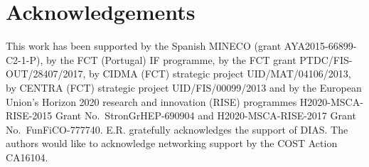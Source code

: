 \documentclass[twocolumn,aps,showpacs,showkeys,prd,superscriptaddress,byrevtex, amsmath]{revtex4-1}
\begin{document}
\section*{Acknowledgements}

This work has been supported by the Spanish MINECO (grant AYA2015-66899-C2-1-P), by the FCT (Portugal) IF programme, by the FCT grant PTDC/FIS-OUT/28407/2017, by  CIDMA (FCT) strategic project UID/MAT/04106/2013, by CENTRA (FCT) strategic project UID/FIS/00099/2013 and by  the  European  Union's  Horizon  2020  research  and  innovation  (RISE) programmes H2020-MSCA-RISE-2015 Grant No.~StronGrHEP-690904 and H2020-MSCA-RISE-2017 Grant No.~FunFiCO-777740. E.R. gratefully acknowledges the support of DIAS. The authors would like to acknowledge networking support by the COST Action CA16104.  
\end{document}

